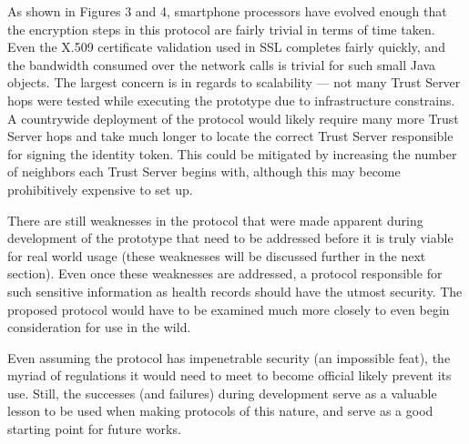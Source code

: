 As shown in Figures 3 and 4, smartphone processors have evolved enough that the encryption steps in this protocol are fairly trivial in terms of time taken. Even the X.509 certificate validation used in SSL completes fairly quickly, and the bandwidth consumed over the network calls is trivial for such small Java objects. The largest concern is in regards to scalability --- not many Trust Server hops were tested while executing the prototype due to infrastructure constrains. A countrywide deployment of the protocol would likely require many more Trust Server hops and take much longer to locate the correct Trust Server responsible for signing the identity token. This could be mitigated by increasing the number of neighbors each Trust Server begins with, although this may become prohibitively expensive to set up.

There are still weaknesses in the protocol that were made apparent during development of the prototype that need to be addressed before it is truly viable for real world usage (these weaknesses will be discussed further in the next section). Even once these weaknesses are addressed, a protocol responsible for such sensitive information as health records should have the utmost security. The proposed protocol would have to be examined much more closely to even begin consideration for use in the wild.

Even assuming the protocol has impenetrable security (an impossible feat), the myriad of regulations it would need to meet to become official likely prevent its use. Still, the successes (and failures) during development serve as a valuable lesson to be used when making protocols of this nature, and serve as a good starting point for future works.